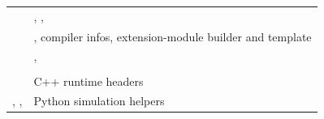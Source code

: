 \begin{xltabular}{\linewidth}{@{}>{\raggedright\arraybackslash}p{5.6cm} >{\raggedright\arraybackslash}X@{}}
   & , , \\
   & , compiler infos, extension-module builder and template\\
   & , \\
   & \\
   & C++ runtime headers\\
  , ,  & Python simulation helpers\\
  \bottomrule
\end{xltabular}
\endgroup
